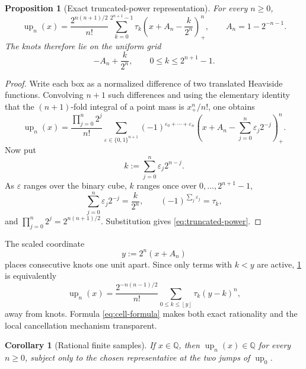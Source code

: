 \documentclass[11pt,oneside]{article}
\newtheorem{proposition}[theorem]{Proposition}
\newtheorem{corollary}[theorem]{Corollary}
\theoremstyle{definition}
\theoremstyle{remark}
\newcommand{\Q}{\mathbb Q}
\newcommand{\up}{\operatorname{up}}
\newcommand{\pos}[1]{\left(#1\right)_{+}}
\newcommand{\floor}[1]{\left\lfloor#1\right\rfloor}
\begin{document}
\begin{proposition}[Exact truncated-power representation]\label{prop:truncated-power}
For every \(n\ge0\),
\begin{equation}\label{eq:truncated-power}
 \boxed{\displaystyle
 \up_n(x)=\frac{2^{n(n+1)/2}}{n!}
 \sum_{k=0}^{2^{n+1}-1}\tau_k
 \pos{x+A_n-\frac{k}{2^n}}^{n},
 \qquad A_n=1-2^{-n-1}.}
\end{equation}
The knots therefore lie on the uniform grid
\begin{equation}\label{eq:knot-grid}
 -A_n+\frac{k}{2^n},\qquad 0\le k\le2^{n+1}-1.
\end{equation}
\end{proposition}

\begin{proof}
Write each box as a normalized difference of two translated Heaviside
functions.  Convolving \(n+1\) such differences and using the elementary
identity that the \((n+1)\)-fold integral of a point mass is
\(x_+^n/n!\), one obtains
\begin{equation}\label{eq:subset-form}
 \up_n(x)=\frac{\prod_{j=0}^{n}2^j}{n!}
 \sum_{\varepsilon\in\{0,1\}^{n+1}}
 (-1)^{\varepsilon_0+\cdots+\varepsilon_n}
 \pos{x+A_n-\sum_{j=0}^{n}\varepsilon_j2^{-j}}^n.
\end{equation}
Now put
\[
 k:=\sum_{j=0}^{n}\varepsilon_j2^{n-j}.
\]
As \(\varepsilon\) ranges over the binary cube, \(k\) ranges once over
\(0,\ldots,2^{n+1}-1\),
\[
 \sum_{j=0}^{n}\varepsilon_j2^{-j}=\frac{k}{2^n},
 \qquad
 (-1)^{\sum_j\varepsilon_j}=\tau_k,
\]
and \(\prod_{j=0}^{n}2^j=2^{n(n+1)/2}\).  Substitution gives
\eqref{eq:truncated-power}.
\end{proof}

The scaled coordinate
\begin{equation}\label{eq:y-scaled}
 y:=2^n(x+A_n)
\end{equation}
places consecutive knots one unit apart.  Since only terms with \(k<y\) are
active, \cref{prop:truncated-power} is equivalently
\begin{equation}\label{eq:cell-formula}
 \boxed{\displaystyle
 \up_n(x)=\frac{2^{-n(n-1)/2}}{n!}
 \sum_{0\le k\le\floor y}\tau_k(y-k)^n,}
\end{equation}
away from knots.  Formula \eqref{eq:cell-formula} makes both exact rationality
and the local cancellation mechanism transparent.

\begin{corollary}[Rational finite samples]\label{cor:rational-samples}
If \(x\in\Q\), then \(\up_n(x)\in\Q\) for every \(n\ge0\), subject only to
the chosen representative at the two jumps of \(\up_0\).
\end{corollary}
\end{document}
